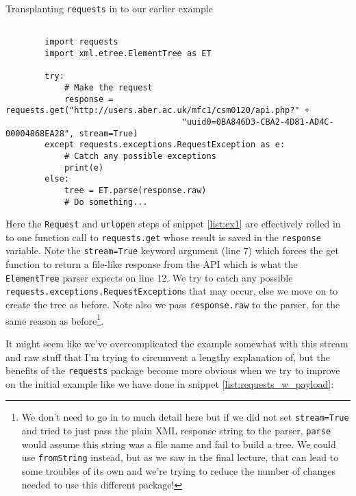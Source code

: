 \documentclass[a4paper]{article}
\begin{document}
\begin{listing}[H]
    \caption[]{Transplanting \texttt{requests} in to our earlier example}
    \label{list:requests_101}
    \begin{verbatim}

        import requests
        import xml.etree.ElementTree as ET

        try:
            # Make the request
            response = requests.get("http://users.aber.ac.uk/mfc1/csm0120/api.php?" +
                                    "uuid0=0BA846D3-CBA2-4D81-AD4C-00004868EA28", stream=True)
        except requests.exceptions.RequestException as e:
            # Catch any possible exceptions
            print(e)
        else:
            tree = ET.parse(response.raw)
            # Do something...

    \end{verbatim}
\end{listing}

Here the \texttt{Request} and \texttt{urlopen} steps of snippet \ref{list:ex1} are
effectively rolled in to one function call to \texttt{requests.get} whose result
is saved in the \texttt{response} variable. Note the
\texttt{stream=True} keyword argument (line 7) which forces the get function to
return a file-like response from the API which is what the \texttt{ElementTree}
parser expects on line 12. We try to catch any possible \texttt{requests.exceptions.RequestException}s
that may occur, else we move on to create the tree as before. Note also we pass
\texttt{response.raw} to the parser, for the same reason as before\footnote{We don't need
to go in to much detail here but if we did not set \texttt{stream=True} and tried
to just pass the plain XML response string to the parser, \texttt{parse} would assume
this string was a file name and fail to build a tree. We could use \texttt{fromString} instead,
but as we saw in the final lecture, that can lead to some troubles of its own and
we're trying to reduce the number of changes needed to use this different package!}.

It might seem like we've overcomplicated the example somewhat with this stream
and raw stuff that I'm trying to circumvent a lengthy explanation of, but the benefits of
the \texttt{requests} package become more obvious when we try to improve
on the initial example like we have done in snippet \ref{list:requests_w_payload}:
\end{document}
